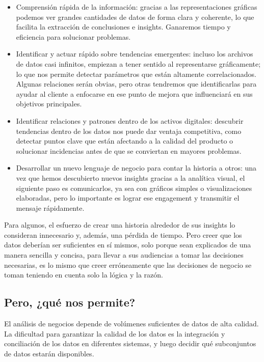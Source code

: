 \documentclass[preprint,12pt]{elsarticle}
\begin{document}
	\begin{itemize}
		\item Comprensión rápida de la información: gracias a las representaciones gráficas podemos ver grandes cantidades de datos de forma clara y coherente, lo que facilita la extracción de conclusiones e insights. Ganaremos tiempo y eficiencia para solucionar problemas.

		\item Identificar y actuar rápido sobre tendencias emergentes: incluso los archivos de datos casi infinitos, empiezan a tener sentido al representarse gráficamente; lo que nos permite detectar parámetros que están altamente correlacionados. Algunas relaciones serán obvias, pero otras tendremos que identificarlas para ayudar al cliente a enfocarse en ese punto de mejora que influenciará en sus objetivos principales.

		\item Identificar relaciones y patrones dentro de los activos digitales: descubrir tendencias dentro de los datos nos puede dar ventaja competitiva, como detectar puntos clave que están afectando a la calidad del producto o solucionar incidencias antes de que se conviertan en mayores problemas.

		\item Desarrollar un nuevo lenguaje de negocio para contar la historia a otros: una vez que hemos descubierto nuevos insights gracias a la analítica visual, el siguiente paso es comunicarlos, ya sea con gráficos simples o visualizaciones elaboradas, pero lo importante es lograr ese engagement y transmitir el mensaje rápidamente.	
	\end{itemize}
Para algunos, el esfuerzo de crear una historia alrededor de sus insights lo consideran innecesario y, además, una pérdida de tiempo. Pero creer que los datos deberían ser suficientes en sí mismos, solo porque sean explicados de una manera sencilla y concisa, para llevar a sus audiencias a tomar las decisiones necesarias, es lo mismo que creer erróneamente que las decisiones de negocio se toman teniendo en cuenta solo la lógica y la razón.\\


	\subsection{Pero, ¿qué nos permite?}
	El análisis de negocios depende de volúmenes suficientes de datos de alta calidad. La dificultad para garantizar la calidad de los datos es la integración y conciliación de los datos en diferentes sistemas, y luego decidir qué subconjuntos de datos estarán disponibles. \\
\end{document}
